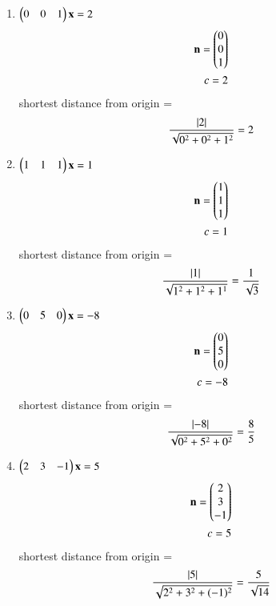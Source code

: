 \begin{enumerate}[label = (\alph*)]

\item $\begin{pmatrix}0&0&1\end{pmatrix}\mathbf{x} = 2 $
\begin{align}
\mathbf{n} = \begin{pmatrix}0\\0\\1\end{pmatrix}\\
c = 2
\end{align}
 shortest distance from origin = 
\begin{align}
\frac{\left\vert2\right\vert}{\sqrt{0^2+0^2+1^2}} = 2
\end{align}

\item $\begin{pmatrix}1&1&1\end{pmatrix}\mathbf{x} = 1 $
\begin{align}
\mathbf{n} = \begin{pmatrix}1\\1\\1\end{pmatrix}\\
c = 1
\end{align}
 shortest distance from origin = 
\begin{align}
\frac{\left\vert1\right\vert}{\sqrt{1^2+1^2+1^1}} = \frac{1}{\sqrt{3}}
\end{align}

\item $\begin{pmatrix}0&5&0\end{pmatrix}\mathbf{x} = -8 $
\begin{align}
\mathbf{n} = \begin{pmatrix}0\\5\\0\end{pmatrix}\\
c = -8
\end{align}
 shortest distance from origin = 
\begin{align}
\frac{\left\vert-8\right\vert}{\sqrt{0^2+5^2+0^2}} = \frac{8}{5}
\end{align}

\item $\begin{pmatrix}2&3&-1\end{pmatrix}\mathbf{x} = 5 $
\begin{align}
\mathbf{n} = \begin{pmatrix}2\\3\\-1\end{pmatrix}\\
c = 5
\end{align}
 shortest distance from origin = 
\begin{align}
\frac{\left\vert5\right\vert}{\sqrt{2^2+3^2+(-1)^2}} = \frac{5}{\sqrt{14}}
\end{align}
\end{enumerate}
